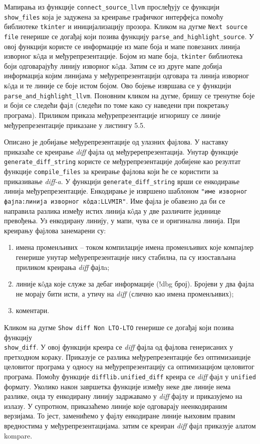 \documentclass[12pt,oneside]{memoir}
\begin{document}
Мапирања из функције  \texttt{connect\_source\_llvm} прослеђују се функцији \\ \texttt{show\_files} која је задужена за креирање графичког интерфејса помоћу
библиотеке \texttt{tkinter} и иницијализацију прозора.
Кликом на дугме \texttt{Next source file} генерише се догађај који позива функцију
\texttt{parse\_and\_highlight\_source}.
У овој функцији користе се информације из мапе боја и мапе повезаних линија изворног
 к\^{o}да и међурепрезентације.
Бојом из мапе боја, \texttt{tkinter} библиотека боји одговарајућу линију изворног
к\^{o}да.
Затим се из друге мапе добија информација којим линијама у међурепрезентацији
одговара та линија изворног к\^{o}да и те линије се боје истом бојом.
Ово бојење извршава се у функцији \texttt{parse\_and\_highlight\_llvm}.
Поновним кликом на дугме, бришу се тренутне боје и боји се следећи фајл (следећи по томе како су наведени при покретању програма).
Приликом приказа међурепрезентације игноришу се линије међурепрезентације приказане
у листингу 5.5.


Описано је добијање међурепрезентације од улазних фајлова.
У наставку приказаће се креирање \textit{diff} фајла од међуререпрезентација.
Унутар функције \texttt{generate\_diff\_string} користе се међурепрезентације добијене
као резултат функције \texttt{compile{\_}files} за креирање фајлова који ће се користити за приказивање \textit{diff-a}.
У функцији  \texttt{generate\_diff\_string} врши се енкодирање линија међурепрезентације.
Енкодирање је извршено шаблоном \texttt{"име изворног фајла:линија изворног  к\^{o}да:LLVMIR"}.
Име фајла је обавезно да би се направила разлика између истих линија  к\^{o}да у две различите јединице превођења.
Уз енкодирану линију, у мапи, чува се и оригинална линија.
При креирању фајлова занемарени су:
\begin{enumerate}
\item имена променљивих -- током компилације имена променљивих које компајлер генерише унутар међурепрезентације нису стабилна, па су изостављана приликом
креирања \textit{diff} фајлa; 
\item линије к\^{o}да које служе за дебаг информације (!dbg број). Бројеви у два
	фајла не морају бити исти, а утичу на \textit{diff} (слично као имена променљивих);
\item коментари.
\end{enumerate}

Кликом на дугме \texttt{Show diff Non LTO-LTO} генерише се догађај који позива функцију 
\\ \texttt{show\_diff}.
У овој функцији креира се \textit{diff} фајла од фајлова генерисаних у претходном
кораку.
Приказује се разлика међурепрезентације без оптимизаиције целовитог програма
у односу на  међурепрезентацију са оптимизацијом целовитог програма.
Помоћу функције \texttt{difflib.unified\_diff} креира се \textit{diff} фајл
у \texttt{unified} формату.
Уколико након завршетка функције између неке две линије нема разлике, онда ту
енкодирану линију задржавамо у \textit{diff} фајлу и приказујемо на излазу.
У супротном, приказаћемо линије које одговарају неенкодираним верзијама.
То јест, заменићемо у фајлу енкодиране линије њиховим правим вредностима у међурепрезентацијама.
затим се креиран \textit{diff} фајл приказује алатом kompare.
\end{document}
